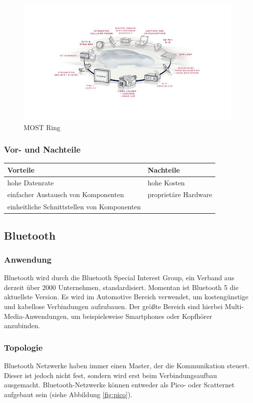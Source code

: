 \begin{figure}[h!]
	\includegraphics[width=\linewidth]{most-ring.jpg}
	\caption[https://images.tecchannel.de/bdb/361603/840x473.jpg]{MOST Ring}
	\label{fig:ring}
\end{figure}

\subsubsection{Vor- und Nachteile}
\begin{tabular}{l|l}
	\textbf{Vorteile} & \textbf{Nachteile}\\
	\hline hohe Datenrate & hohe Kosten\\
	\hline einfacher Austausch von Komponenten & proprietäre Hardware\\
	\hline einheitliche Schnittstellen von Komponenten &\\
\end{tabular}

\subsection{Bluetooth}		
\subsubsection{Anwendung}
Bluetooth wird durch die Bluetooth Special Interest Group, ein Verband aus derzeit über 2000 Unternehmen,  standardisiert. Momentan ist Bluetooth 5 die aktuellste Version. Es wird im Automotive Bereich verwendet, um kostengünstige und kabellose Verbindungen aufzubauen. Der größte Bereich sind hierbei Multi-Media-Anwendungen, um beispielsweise Smartphones oder Kopfhörer anzubinden. \cite{BP01}

\subsubsection{Topologie}
Bluetooth Netzwerke haben immer einen Master, der die Kommunikation steuert. Dieser ist jedoch nicht fest, sondern wird erst beim Verbindungsaufbau ausgemacht.
Bluetooth-Netzwerke können entweder als Pico- oder Scatternet aufgebaut sein (siehe Abbildung \ref{fig:pico}).
                                                                                  
